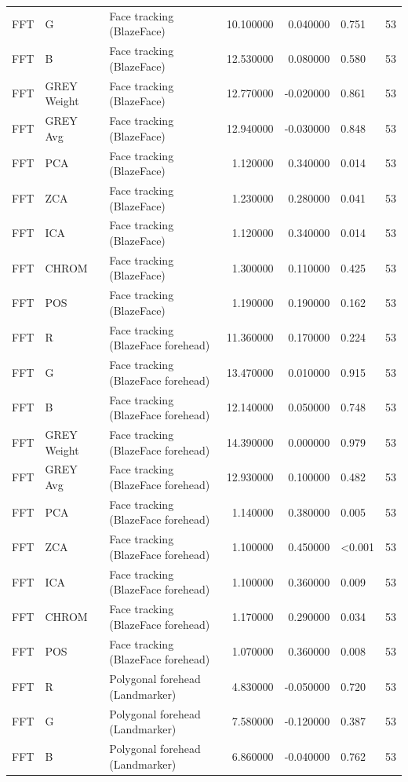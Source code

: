 \begin{table}[htbp]
\begin{tabular}{l l l r r l r}
FFT & G & Face tracking (BlazeFace) & 10.100000 & 0.040000 & 0.751 & 53 \\
FFT & B & Face tracking (BlazeFace) & 12.530000 & 0.080000 & 0.580 & 53 \\
FFT & GREY Weight & Face tracking (BlazeFace) & 12.770000 & -0.020000 & 0.861 & 53 \\
FFT & GREY Avg & Face tracking (BlazeFace) & 12.940000 & -0.030000 & 0.848 & 53 \\
FFT & PCA & Face tracking (BlazeFace) & 1.120000 & 0.340000 & 0.014 & 53 \\
FFT & ZCA & Face tracking (BlazeFace) & 1.230000 & 0.280000 & 0.041 & 53 \\
FFT & ICA & Face tracking (BlazeFace) & 1.120000 & 0.340000 & 0.014 & 53 \\
FFT & CHROM & Face tracking (BlazeFace) & 1.300000 & 0.110000 & 0.425 & 53 \\
FFT & POS & Face tracking (BlazeFace) & 1.190000 & 0.190000 & 0.162 & 53 \\
FFT & R & Face tracking (BlazeFace forehead) & 11.360000 & 0.170000 & 0.224 & 53 \\
FFT & G & Face tracking (BlazeFace forehead) & 13.470000 & 0.010000 & 0.915 & 53 \\
FFT & B & Face tracking (BlazeFace forehead) & 12.140000 & 0.050000 & 0.748 & 53 \\
FFT & GREY Weight & Face tracking (BlazeFace forehead) & 14.390000 & 0.000000 & 0.979 & 53 \\
FFT & GREY Avg & Face tracking (BlazeFace forehead) & 12.930000 & 0.100000 & 0.482 & 53 \\
FFT & PCA & Face tracking (BlazeFace forehead) & 1.140000 & 0.380000 & 0.005 & 53 \\
FFT & ZCA & Face tracking (BlazeFace forehead) & 1.100000 & 0.450000 & <0.001 & 53 \\
FFT & ICA & Face tracking (BlazeFace forehead) & 1.100000 & 0.360000 & 0.009 & 53 \\
FFT & CHROM & Face tracking (BlazeFace forehead) & 1.170000 & 0.290000 & 0.034 & 53 \\
FFT & POS & Face tracking (BlazeFace forehead) & 1.070000 & 0.360000 & 0.008 & 53 \\
FFT & R & Polygonal forehead (Landmarker) & 4.830000 & -0.050000 & 0.720 & 53 \\
FFT & G & Polygonal forehead (Landmarker) & 7.580000 & -0.120000 & 0.387 & 53 \\
FFT & B & Polygonal forehead (Landmarker) & 6.860000 & -0.040000 & 0.762 & 53 \\

\end{tabular}
\end{table}
